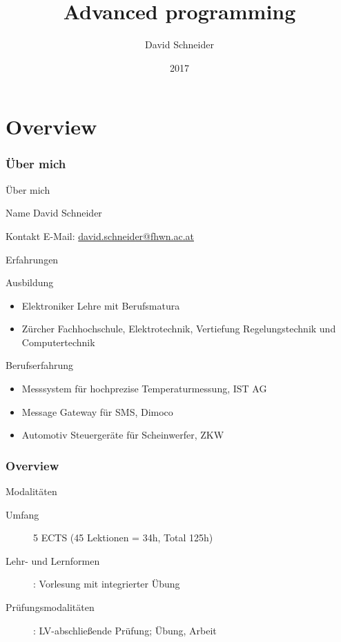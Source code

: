 \documentclass{beamer}
\title{Advanced programming}
\author{David Schneider}
\date{2017}
\begin{document}
\frame{\titlepage}

\part{Overview}

\section{Über mich}

\begin{frame}{Über mich}
\begin{block}{Name}
David Schneider
\end{block}

\begin{block}{Kontakt}
E-Mail: \url{david.schneider@fhwn.ac.at}
\end{block}

\end{frame}

\begin{frame}{Erfahrungen}

\begin{block}{Ausbildung}
\begin{itemize}
  \item Elektroniker Lehre mit Berufsmatura
  \item Zürcher Fachhochschule, Elektrotechnik, Vertiefung Regelungstechnik und
Computertechnik
\end{itemize}
\end{block}

\begin{block}{Berufserfahrung}
\begin{itemize}
  \item Messsystem für hochprezise Temperaturmessung, IST AG
  \item Message Gateway für SMS, Dimoco
  \item Automotiv Steuergeräte für Scheinwerfer, ZKW
\end{itemize}
\end{block}

\end{frame}

\section{Overview}

\begin{frame}{Modalitäten}
\begin{description}
\item[Umfang] 5 ECTS (45 Lektionen = 34h, Total 125h)
\item[Lehr- und Lernformen]: Vorlesung mit integrierter Übung
\item[Prüfungsmodalitäten]: LV-abschließende Prüfung; Übung, Arbeit
\end{description}
\end{frame}
\end{document}
